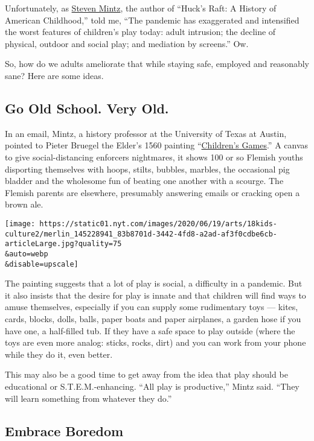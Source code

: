 Unfortunately, as
\href{https://liberalarts.utexas.edu/history/faculty/shm654}{Steven
Mintz}, the author of ``Huck's Raft: A History of American Childhood,''
told me, ``The pandemic has exaggerated and intensified the worst
features of children's play today: adult intrusion; the decline of
physical, outdoor and social play; and mediation by screens.'' Ow.

So, how do we adults ameliorate that while staying safe, employed and
reasonably sane? Here are some ideas.

\hypertarget{go-old-school-very-old}{%
\subsection{Go Old School. Very Old.}\label{go-old-school-very-old}}

In an email, Mintz, a history professor at the University of Texas at
Austin, pointed to Pieter Bruegel the Elder's 1560 painting
``\href{https://artsandculture.google.com/asset/children\%E2\%80\%99s-games-pieter-bruegel-the-elder/CQEeZWQPOI2Yjg?hl=en}{Children's
Games}.'' A canvas to give social-distancing enforcers nightmares, it
shows 100 or so Flemish youths disporting themselves with hoops, stilts,
bubbles, marbles, the occasional pig bladder and the wholesome fun of
beating one another with a scourge. The Flemish parents are elsewhere,
presumably answering emails or cracking open a brown ale.

\texttt{[image: https://static01.nyt.com/images/2020/06/19/arts/18kids-culture2/merlin\_145228941\_83b8701d-3442-4fd8-a2ad-af3f0cdbe6cb-articleLarge.jpg?quality=75\\\&auto=webp\\\&disable=upscale]}

The painting suggests that a lot of play is social, a difficulty in a
pandemic. But it also insists that the desire for play is innate and
that children will find ways to amuse themselves, especially if you can
supply some rudimentary toys --- kites, cards, blocks, dolls, balls,
paper boats and paper airplanes, a garden hose if you have one, a
half-filled tub. If they have a safe space to play outside (where the
toys are even more analog: sticks, rocks, dirt) and you can work from
your phone while they do it, even better.

This may also be a good time to get away from the idea that play should
be educational or S.T.E.M.-enhancing. ``All play is productive,'' Mintz
said. ``They will learn something from whatever they do.''

\hypertarget{embrace-boredom}{%
\subsection{Embrace Boredom}\label{embrace-boredom}}


